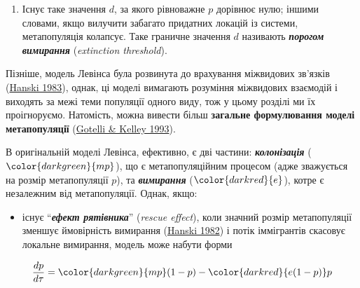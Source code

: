 \documentclass[
  11pt,
]{book}
\providecommand{\tightlist}{%
  \setlength{\itemsep}{0pt}\setlength{\parskip}{0pt}}
\begin{document}
\begin{enumerate}
\def\labelenumi{\arabic{enumi}.}
\setcounter{enumi}{2}
\tightlist
\item
  Існує таке значення \(d\), за якого рівноважне \(p\) дорівнює нулю; іншими словами, якщо вилучити забагато придатних локацій із системи, метапопуляція колапсує. Таке граничне значення \(d\) називають \textbf{\emph{порогом вимирання}} (\emph{extinction threshold}).
\end{enumerate}

Пізніше, модель Левінса була розвинута до врахування міжвидових зв'язків (\href{http://doi.org/10.2307/1939969}{Hanski 1983}), однак, ці моделі вимагають розуміння міжвидових взаємодій і виходять за межі теми популяції одного виду, тож у цьому розділі ми їх проігноруємо. Натомість, можна вивести більш \textbf{загальне формулювання моделі метапопуляції} (\href{https://doi.org/10.2307/3545306}{Gotelli \& Kelley 1993}).

В оригінальній моделі Левінса, ефективно, є дві частини: \textbf{\emph{колонізація}} (\(\color{darkgreen}{mp}\)), що є метапопуляційним процесом (адже зважується на розмір метапопуляції \(p\)), та \textbf{\emph{вимирання}} (\(\color{darkred}{e}\)), котре є незалежним від метапопуляції. Однак, якщо:

\begin{itemize}
\tightlist
\item
  існує ``\textbf{\emph{ефект рятівника}}'' (\emph{rescue effect}), коли значний розмір метапопуляції зменшує ймовірність вимирання (\href{https://doi.org/10.2307/3544021}{Hanski 1982}) і потік іммігрантів скасовує локальне вимирання, модель може набути форми
\end{itemize}

\[\frac{dp}{d\tau} = \color{darkgreen}{mp}(1 - p) - \color{darkred}{e(1-p)}p\]
\end{document}
